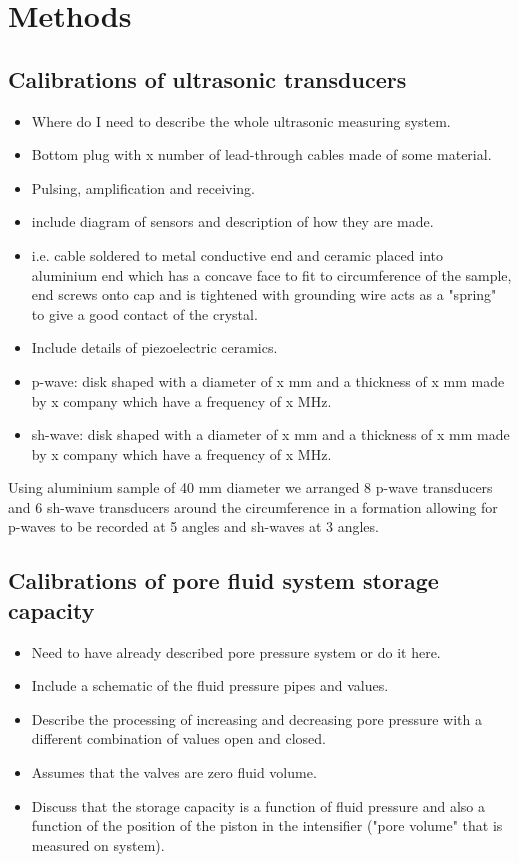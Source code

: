 \chapter{Methods}
\label{chapterlabel2}

\section{Calibrations of ultrasonic transducers}
\begin{itemize}
    \item Where do I need to describe the whole ultrasonic measuring system.
    \item Bottom plug with x number of lead-through cables made of some material.
    \item Pulsing, amplification and receiving. 
    \item include diagram of sensors and description of how they are made.
    \item i.e. cable soldered to metal conductive end and ceramic placed into aluminium end which has a concave face to fit to circumference of the sample, end screws onto cap and is tightened with grounding wire acts as a "spring" to give a good contact of the crystal.
    \item Include details of piezoelectric ceramics. 
    \item p-wave: disk shaped with a diameter of x mm and a thickness of x mm made by x company which have a frequency of x MHz.
    \item sh-wave: disk shaped with a diameter of x mm and a thickness of x mm made by x company which have a frequency of x MHz.
\end{itemize}



Using aluminium sample of 40 mm diameter we arranged 8 p-wave transducers and 6 sh-wave transducers around the circumference in a formation allowing for p-waves to be recorded at 5 angles and sh-waves at 3 angles.


\section{Calibrations of pore fluid system storage capacity}
\begin{itemize}
    \item Need to have already described pore pressure system or do it here.
    \item Include a schematic of the fluid pressure pipes and values.
    \item Describe the processing of increasing and decreasing pore pressure with a different combination of values open and closed.
    \item Assumes that the valves are zero fluid volume.
    \item Discuss that the storage capacity is a function of fluid pressure and also a function of the position of the piston in the intensifier ("pore volume" that is measured on system).
\end{itemize}


